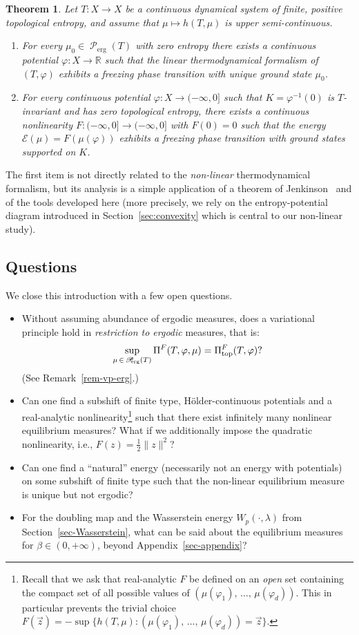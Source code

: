 \documentclass[10pt]{amsart}
\theoremstyle{definition}\newtheorem{defi}[theo]{Definition}\newtheorem{rema}[theo]{Remark}\newtheorem{exam}[theo]{Example}\newtheorem{exem}[theo]{Example}\newtheorem{nota}[theo]{Notation}
\theoremstyle{plain}
\newtheorem{theol}{Theorem}
\theoremstyle{plain}
\newcommand\Proberg{\Prob_{\kern-3pt\mathrm{erg}}}
\newcommand\erg{\mathrm{erg}}
\renewcommand\top{{\mathrm{top}}}
\newcommand\Prob{{\operatorname{\mathscr{P}}}}
\newcommand{\pot}{\varphi}
\newcommand*\8{\infty}
\newcommand\RR{\mathbb{R}}
\newcommand{\En}{\mathcal{E}}
\begin{document}
\begin{theol}\label{thm-fpt}
Let $T:X\to X$ be a continuous dynamical system of finite, positive topological entropy, and assume that $\mu\mapsto h(T,\mu)$ is upper semi-continuous.
\begin{enumerate}
\item For every $\mu_0\in\Prob_\erg(T)$ with zero entropy there exists a continuous potential $\pot:X\to \RR$ such that the \emph{linear} thermodynamical formalism of $(T,\pot)$ exhibits a freezing phase transition with unique ground state $\mu_0$.
\item For every continuous potential $\pot:X\to(-\infty,0]$ such that $K=\pot^{-1}(0)$ is $T$-invariant and has zero topological entropy, there exists a continuous nonlinearity $F : (-\infty,0]\to (-\infty,0]$ with $F(0)=0$ such that the energy $\En(\mu) = F(\mu(\pot))$ exhibits a freezing phase transition with ground states supported on $K$.
\end{enumerate}
\end{theol}

The first item is not directly related to the \emph{non-linear} thermodynamical formalism, but its analysis is a simple application of a theorem of Jenkinson~\cite{Jenkinson} and of the tools developed here (more precisely, we rely on the entropy-potential diagram introduced in Section~\ref{sec:convexity} which is central to our non-linear study).



\subsection{Questions}\label{subsec-questions}

We close this introduction with a few open questions.
\begin{itemize}
\item Without assuming abundance of ergodic measures, does a variational principle hold in \emph{restriction to ergodic} measures, that is:
\[
\sup_{\mu\,\in\,\Proberg(T)} \Pi^F(T,\pot,\mu) = \Pi^F_\top(T,\pot)?
\]
(See Remark~\ref{rem-vp-erg}.)
\item Can one find a subshift of finite type, H\"older-continuous potentials and a real-analytic nonlinearity\footnote{Recall that we ask that { real-analytic} $F$ be defined on an \emph{open} set containing the compact set of all possible values of $(\mu(\pot_1),\,\dots,\,\mu(\pot_d))$. This in particular prevents the trivial choice $F(\vec z) = -\sup\{h(T,\mu) \colon (\mu(\pot_1),\,\dots,\,\mu(\pot_d))=\vec z \}$.} such that there exist infinitely many nonlinear equilibrium measures? What if we additionally impose the quadratic nonlinearity, i.e., $F(z) = \frac12\lVert z\rVert^2$?
\item Can one find a ``natural'' energy {(necessarily not an energy with potentials) on some subshift of finite type} such that the non-linear equilibrium measure is unique but not ergodic?
\item { For the doubling map and the Wasserstein energy $W_p(\cdot,\lambda)$ from Section~\ref{sec-Wasserstein},} what can be said about the equilibrium measures for $\beta\in(0,+\infty)$, beyond Appendix~\ref{sec-appendix}?
\end{itemize}
\end{document}
